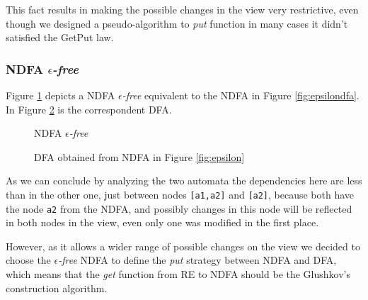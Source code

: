 This fact results in making the possible changes in the view very restrictive, even though we designed a pseudo-algorithm to \textit{put} function in many cases it didn't satisfied the GetPut law. 

\subsubsection{NDFA \textit{$\epsilon$-free}} Figure \ref{fig:glundfa} depicts a NDFA \textit{$\epsilon$-free} equivalent to the NDFA in Figure \ref{fig:epsilondfa}. In Figure \ref{fig:gludfa} is the correspondent DFA. 

\begin{figure}[H]
    \centering
    \caption{NDFA \textit{$\epsilon$-free}}
    \label{fig:glundfa}
\end{figure}

\begin{figure}
    \centering
    \caption{DFA obtained from NDFA in Figure \ref{fig:epsilon}}
    \label{fig:gludfa}
\end{figure}

As we can conclude by analyzing the two automata the dependencies here are less than in the other one, just between nodes \texttt{[a1,a2]} and \texttt{[a2]}, because both have the node \texttt{a2} from the NDFA, and possibly changes in this node will be reflected in both nodes in the view, even only one was modified in the first place. 

However, as it allows a wider range of possible changes on the view we decided to choose the \textit{$\epsilon$-free} NDFA to define the \textit{put} strategy between NDFA and DFA, which means that the \textit{get} function from RE to NDFA should be the Glushkov's construction algorithm. 

